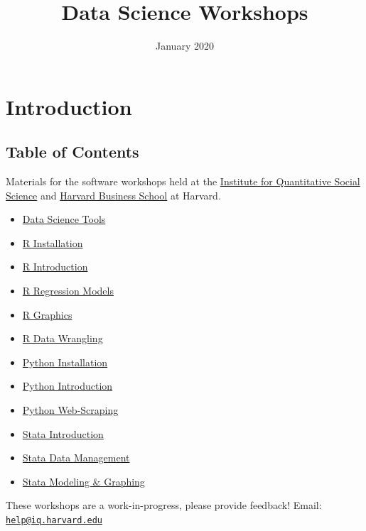 \documentclass[]{book}
\title{Data Science Workshops}
\author{}
\date{January 2020}
\providecommand{\tightlist}{%
  \setlength{\itemsep}{0pt}\setlength{\parskip}{0pt}}
\begin{document}
\maketitle

{
\setcounter{tocdepth}{1}
\tableofcontents
}
\hypertarget{introduction}{%
\chapter*{Introduction}\label{introduction}}

\hypertarget{table-of-contents}{%
\section*{Table of Contents}\label{table-of-contents}}

Materials for the software workshops held at the \href{http://iq.harvard.edu}{Institute for Quantitative Social Science} and \href{https://training.rcs.hbs.org}{Harvard Business School} at Harvard.

\begin{itemize}
\tightlist
\item
  \href{./DataScienceTools.html}{Data Science Tools}
\item
  \href{./Rinstall.html}{R Installation}
\item
  \href{./Rintro.html}{R Introduction}
\item
  \href{./Rmodels.html}{R Regression Models}
\item
  \href{./Rgraphics.html}{R Graphics}
\item
  \href{./RDataWrangling.html}{R Data Wrangling}
\item
  \href{./PythonInstall.html}{Python Installation}
\item
  \href{./PythonIntro.html}{Python Introduction}
\item
  \href{./PythonWebScrape.html}{Python Web-Scraping}
\item
  \href{./StataIntro.html}{Stata Introduction}
\item
  \href{./StataDatMan.html}{Stata Data Management}
\item
  \href{./StataModGraph.html}{Stata Modeling \& Graphing}
\end{itemize}

These workshops are a work-in-progress, please provide feedback! Email: \href{mailto:help@iq.harvard.edu}{\nolinkurl{help@iq.harvard.edu}}
\end{document}
